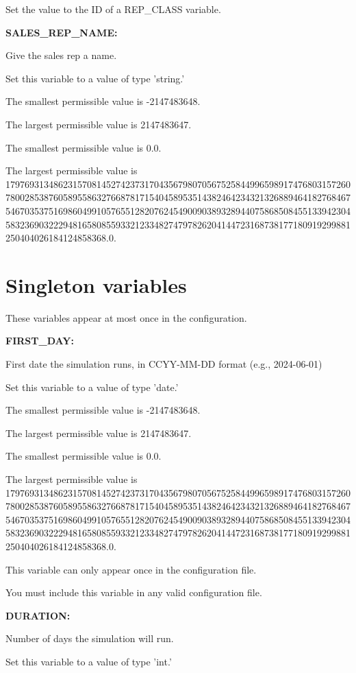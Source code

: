Set the value to the ID of a REP\_CLASS variable.


\textbf{SALES\_REP\_NAME:}


Give the sales rep a name.

Set this variable to a value of type 'string.'

The smallest permissible value is -2147483648.

The largest permissible value is 2147483647.

The smallest permissible value is 0.0.

The largest permissible value is 179769313486231570814527423731704356798070567525844996598917476803157260780028538760589558632766878171540458953514382464234321326889464182768467546703537516986049910576551282076245490090389328944075868508455133942304583236903222948165808559332123348274797826204144723168738177180919299881250404026184124858368.0.


\section{Singleton variables}


These variables appear at most once in the configuration.


\textbf{FIRST\_DAY:}


First date the simulation runs, in CCYY-MM-DD format (e.g., 2024-06-01)

Set this variable to a value of type 'date.'

The smallest permissible value is -2147483648.

The largest permissible value is 2147483647.

The smallest permissible value is 0.0.

The largest permissible value is 179769313486231570814527423731704356798070567525844996598917476803157260780028538760589558632766878171540458953514382464234321326889464182768467546703537516986049910576551282076245490090389328944075868508455133942304583236903222948165808559332123348274797826204144723168738177180919299881250404026184124858368.0.

This variable can only appear once in the configuration file.

You must include  this variable in any valid configuration file.


\textbf{DURATION:}


Number of days the simulation will run.

Set this variable to a value of type 'int.'

